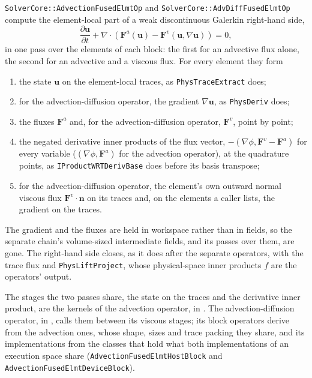 \texttt{SolverCore::AdvectionFusedElmtOp} and
\texttt{SolverCore::AdvDiffFusedElmtOp} compute the element-local part of a
weak discontinuous Galerkin right-hand side,
\begin{equation}
  \frac{\partial \mathbf u}{\partial t}
    + \nabla \cdot \left(\mathbf F^a(\mathbf u)
    - \mathbf F^v(\mathbf u, \nabla \mathbf u)\right) = 0,
\end{equation}
in one pass over the elements of each block: the first for an advective
flux alone, the second for an advective and a viscous flux. For every
element they form
\begin{enumerate}
  \item the state $\mathbf u$ on the element-local traces, as
    \texttt{PhysTraceExtract} does;
  \item for the advection-diffusion operator, the gradient
    $\nabla \mathbf u$, as \texttt{PhysDeriv} does;
  \item the fluxes $\mathbf F^a$ and, for the advection-diffusion operator,
    $\mathbf F^v$, point by point;
  \item the negated derivative inner products of the flux vector,
    $-(\nabla \phi, \mathbf F^v - \mathbf F^a)$ for every variable
    ($(\nabla \phi, \mathbf F^a)$ for the advection operator), at the
    quadrature points, as \texttt{IProductWRTDerivBase} does before its
    basis transpose;
  \item for the advection-diffusion operator, the element's own outward
    normal viscous flux $\mathbf F^v \cdot \mathbf n$ on its traces and, on
    the elements a caller lists, the gradient on the traces.
\end{enumerate}
The gradient and the fluxes are held in workspace rather than in fields, so
the separate chain's volume-sized intermediate fields, and its passes over
them, are gone. The right-hand side closes, as it does after the separate
operators, with the trace flux and \texttt{PhysLiftProject}, whose
physical-space inner products $f$ are the operators' output.

The stages the two passes share, the state on the traces and the derivative
inner product, are the kernels of the advection operator, in
. The
advection-diffusion operator, in
, calls them between
its viscous stages; its block operators derive from the advection ones,
whose shape, sizes and trace packing they share, and its implementations
from the classes that hold what both implementations of an execution space
share (\texttt{AdvectionFusedElmtHostBlock} and
\texttt{AdvectionFusedElmtDeviceBlock}).

